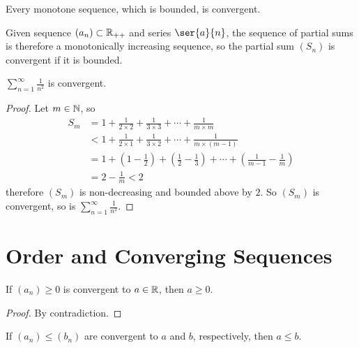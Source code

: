 \documentclass[11pt]{article}
\begin{document}
        \begin{theorem}
            Every monotone sequence, which is bounded, is convergent.
        \end{theorem}
        
        \begin{corollary}
            Given sequence $(a_n) \subset \mathbb{R}_{++}$ and series $\ser{a}{n}$, the sequence of partial sums is therefore a monotonically increasing sequence, so the partial sum $(S_n)$ is convergent if it is bounded.
        \end{corollary}
        
        \begin{example}
            $\sum_{n=1}^\infty \frac{1}{n^2}$ is convergent.
        \end{example}
        
        \begin{proof}
            Let $m \in \mathbb{N}$, so
            \begin{align}
                S_m &= 1 + \frac{1}{2\times 2} + \frac{1}{3 \times 3} + \cdots + \frac{1}{m \times m} \\
                &< 1 + \frac{1}{2\times 1} + \frac{1}{3\times 2} + \cdots + \frac{1}{m \times (m-1)} \\
                &= 1 + (1-\frac{1}{2}) + (\frac{1}{2} - \frac{1}{3}) + \cdots + (\frac{1}{m-1} - \frac{1}{m}) \\
                &= 2 - \frac{1}{m} < 2
            \end{align}
            therefore $(S_m)$ is non-decreasing and bounded above by $2$. So $(S_m)$ is convergent, so is  $\sum_{n=1}^\infty \frac{1}{n^2}$.
        \end{proof}
        
	\section{Order and Converging Sequences}
		\begin{proposition}
			If $(a_n) \geq 0$ is convergent to $a \in \mathbb{R}$, then $a \geq 0$.
		\end{proposition}
		
		\begin{proof}
			By contradiction.
		\end{proof}
		
		\begin{proposition}
			If $(a_n) \leq (b_n)$ are convergent to $a$ and $b$, respectively, then $a \leq b$.
		\end{proposition}
		
\end{document}
